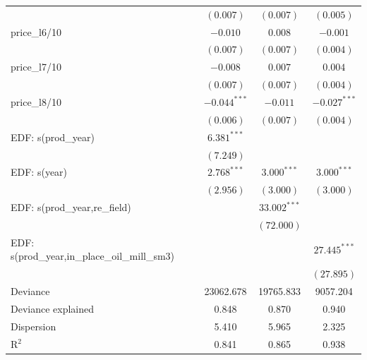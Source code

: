 \documentclass[11pt]{article}
\begin{document}
\begin{table}
\begin{center}
\begin{tabular}{l c c c }
                                             & $(0.007)$      & $(0.007)$      & $(0.005)$        \\
price\_l6/10                              & $-0.010$       & $0.008$        & $-0.001$         \\
                                             & $(0.007)$      & $(0.007)$      & $(0.004)$        \\
price\_l7/10                              & $-0.008$       & $0.007$        & $0.004$          \\
                                             & $(0.007)$      & $(0.007)$      & $(0.004)$        \\
price\_l8/10                              & $-0.044^{***}$ & $-0.011$       & $-0.027^{***}$   \\
                                             & $(0.006)$      & $(0.007)$      & $(0.004)$        \\
EDF: s(prod\_year)                           & $6.381^{***}$  &                &                  \\
                                             & $(7.249)$      &                &                  \\
EDF: s(year)                                 & $2.768^{***}$  & $3.000^{***}$  & $3.000^{***}$    \\
                                             & $(2.956)$      & $(3.000)$      & $(3.000)$        \\
EDF: s(prod\_year,re\_field)                      &                & $33.002^{***}$ &                  \\
                                             &                & $(72.000)$     &                  \\
EDF: s(prod\_year,in\_place\_oil\_mill\_sm3) &                &                & $27.445^{***}$   \\
                                             &                &                & $(27.895)$       \\
\hline
Deviance                                     & 23062.678      & 19765.833      & 9057.204         \\
Deviance explained                           & 0.848          & 0.870          & 0.940            \\
Dispersion                                   & 5.410          & 5.965          & 2.325            \\
R$^2$                                        & 0.841          & 0.865          & 0.938            \\

\end{tabular}
\end{center}
\end{table}
\end{document}
